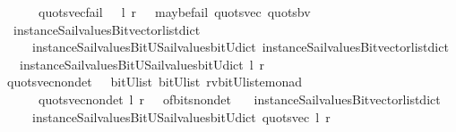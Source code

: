 \begin{isabellebody}
\ \ \ \ \ {\isachardoublequoteopen}\ quots{\isacharunderscore}vec{\isacharunderscore}fail\ \ \ l\ r\ {\isacharequal}\ {\isacharparenleft}\ maybe{\isacharunderscore}fail\ {\isacharparenleft}{\isacharprime}{\isacharprime}quots{\isacharunderscore}vec{\isacharprime}{\isacharprime}{\isacharparenright}\ {\isacharparenleft}quots{\isacharunderscore}bv\ \isanewline
\ \ {\isacharparenleft}instance{\isacharunderscore}Sail{}{\isacharunderscore}values{\isacharunderscore}Bitvector{\isacharunderscore}list{\isacharunderscore}dict\isanewline
\ \ \ \ \ instance{\isacharunderscore}Sail{}{\isacharunderscore}values{\isacharunderscore}BitU{\isacharunderscore}Sail{}{\isacharunderscore}values{\isacharunderscore}bitU{\isacharunderscore}dict{\isacharparenright}\ {\isacharparenleft}instance{\isacharunderscore}Sail{}{\isacharunderscore}values{\isacharunderscore}Bitvector{\isacharunderscore}list{\isacharunderscore}dict\isanewline
\ \ \ instance{\isacharunderscore}Sail{}{\isacharunderscore}values{\isacharunderscore}BitU{\isacharunderscore}Sail{}{\isacharunderscore}values{\isacharunderscore}bitU{\isacharunderscore}dict{\isacharparenright}\ l\ r{\isacharparenright}{\isacharparenright}{\isachardoublequoteclose}\isanewline
\isanewline
{}\isamarkupfalse%
\ quots{\isacharunderscore}vec{\isacharunderscore}nondet\ \ {\isacharcolon}{\isacharcolon}\ {\isachardoublequoteopen}{\isacharparenleft}bitU{\isacharparenright}list\ {\isasymRightarrow}{\isacharparenleft}bitU{\isacharparenright}list\ {\isasymRightarrow}{\isacharparenleft}{\isacharprime}rv{\isacharcomma}{\isacharparenleft}{\isacharparenleft}bitU{\isacharparenright}list{\isacharparenright}{\isacharcomma}{\isacharprime}e{\isacharparenright}monad\ {\isachardoublequoteclose}\ \ \ \isanewline
\ \ \ \ \ {\isachardoublequoteopen}\ quots{\isacharunderscore}vec{\isacharunderscore}nondet\ l\ r\ {\isacharequal}\ {\isacharparenleft}\ of{\isacharunderscore}bits{\isacharunderscore}nondet\ \isanewline
\ \ {\isacharparenleft}instance{\isacharunderscore}Sail{}{\isacharunderscore}values{\isacharunderscore}Bitvector{\isacharunderscore}list{\isacharunderscore}dict\isanewline
\ \ \ \ \ instance{\isacharunderscore}Sail{}{\isacharunderscore}values{\isacharunderscore}BitU{\isacharunderscore}Sail{}{\isacharunderscore}values{\isacharunderscore}bitU{\isacharunderscore}dict{\isacharparenright}\ {\isacharparenleft}quots{\isacharunderscore}vec\ l\ r{\isacharparenright}{\isacharparenright}{\isachardoublequoteclose}\isanewline

\end{isabellebody}
